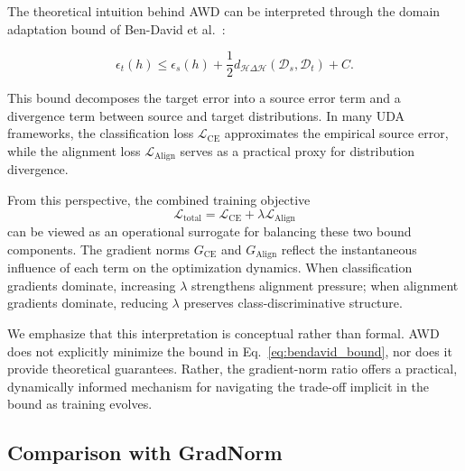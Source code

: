 \documentclass[pdflatex,sn-mathphys-num]{sn-jnl}
\theoremstyle{thmstyleone}
\theoremstyle{thmstyletwo}
\theoremstyle{thmstylethree}
\begin{document}
The theoretical intuition behind AWD can be interpreted through the domain adaptation bound of Ben-David et al.~\cite{bendavid2010theory}:

\begin{equation}
\epsilon_t(h) \leq \epsilon_s(h) + \frac{1}{2} d_{\mathcal{H}\Delta\mathcal{H}}(\mathcal{D}_s, \mathcal{D}_t) + C.
\label{eq:bendavid_bound}
\end{equation}

This bound decomposes the target error into a source error term and a divergence term between source and target distributions. In many UDA frameworks, the classification loss $\mathcal{L}_{\text{CE}}$ approximates the empirical source error, while the alignment loss $\mathcal{L}_{\text{Align}}$ serves as a practical proxy for distribution divergence.

From this perspective, the combined training objective
\begin{equation}
\mathcal{L}_{\text{total}} = \mathcal{L}_{\text{CE}} + \lambda \mathcal{L}_{\text{Align}}
\end{equation}
can be viewed as an operational surrogate for balancing these two bound components. The gradient norms $G_{\text{CE}}$ and $G_{\text{Align}}$ reflect the instantaneous influence of each term on the optimization dynamics. When classification gradients dominate, increasing $\lambda$ strengthens alignment pressure; when alignment gradients dominate, reducing $\lambda$ preserves class-discriminative structure.

We emphasize that this interpretation is conceptual rather than formal. AWD does not explicitly minimize the bound in Eq.~\eqref{eq:bendavid_bound}, nor does it provide theoretical guarantees. Rather, the gradient-norm ratio offers a practical, dynamically informed mechanism for navigating the trade-off implicit in the bound as training evolves.


\subsection{Comparison with GradNorm}
\end{document}
